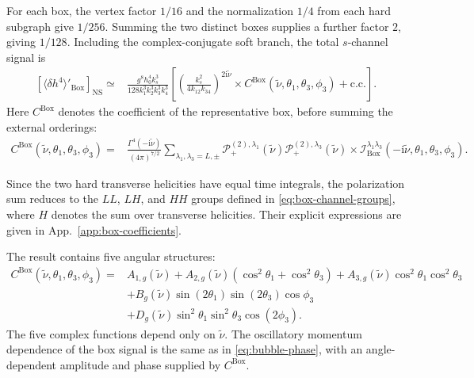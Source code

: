 \documentclass[a4paper,12pt]{article}
\def\ii{\mathrm{i}}
\begin{document}
For each box, the vertex factor $1/16$ and the normalization $1/4$ from each hard subgraph give $1/256$.
Summing the two distinct boxes supplies a further factor $2$, giving $1/128$.
Including the complex-conjugate soft branch, the total $s$-channel signal is
\begin{align}
    \left[\langle\delta h^4\rangle'_{\mathrm{Box}}
    \right]_{\mathrm{NS}}
    \simeq{}&\frac{g^8h_0^4k_s^3}
    {128k_1^3k_2^3k_3^3k_4^3}
    \left[
    \left(\frac{k_s^2}{4k_{12}k_{34}}\right)^{2\ii\tilde\nu}
    \times
    C^{\mathrm{Box}}(\tilde\nu,\theta_1,\theta_3,\phi_3)
    +\text{c.c.}\right].
    \label{eq:box-single-signal}
\end{align}
Here $C^{\mathrm{Box}}$ denotes the coefficient of the representative box, before summing the external orderings:
\begin{align}
    C^{\mathrm{Box}}(\tilde\nu,\theta_1,\theta_3,\phi_3)
    ={}&\frac{\Gamma^4(-\ii\tilde\nu)}{(4\pi)^{7/2}}
    \sum_{\lambda_1,\lambda_3=L,\pm}
    \mathcal P^{(2),\lambda_1}_{+}(\tilde\nu)
    \mathcal P^{(2),\lambda_3}_{+}(\tilde\nu)
    \times\mathcal I^{\lambda_1\lambda_3}_{\mathrm{Box}}
    (-\ii\tilde\nu,\theta_1,\theta_3,\phi_3).
    \label{eq:box-coefficient}
\end{align}

Since the two hard transverse helicities have equal time integrals, the polarization sum reduces to the $LL$, $LH$, and $HH$ groups defined in \eqref{eq:box-channel-groups}, where $H$ denotes the sum over transverse helicities.
Their explicit expressions are given in App.~\ref{app:box-coefficients}.

The result contains five angular structures:
\begin{align}
    C^{\mathrm{Box}}(\tilde\nu,\theta_1,\theta_3,\phi_3)
    ={}&A_{1,g}(\tilde\nu)
    +A_{2,g}(\tilde\nu)(\cos^2\theta_1+\cos^2\theta_3)
    +A_{3,g}(\tilde\nu)\cos^2\theta_1\cos^2\theta_3
    \nonumber\\
    &+B_g(\tilde\nu)\sin(2\theta_1)\sin(2\theta_3)\cos\phi_3
    \nonumber\\
    &+D_g(\tilde\nu)\sin^2\theta_1\sin^2\theta_3\cos(2\phi_3).
    \label{eq:box-angular-expansion}
\end{align}
The five complex functions depend only on $\tilde\nu$.
The oscillatory momentum dependence of the box signal is the same as in \eqref{eq:bubble-phase}, with an angle-dependent amplitude and phase supplied by $C^{\mathrm{Box}}$.

\clearpage
\end{document}
